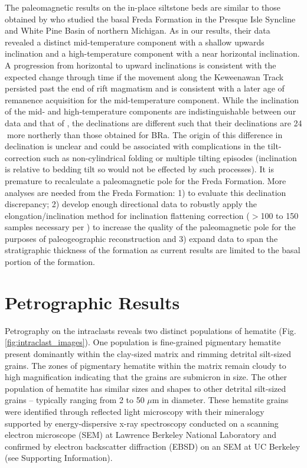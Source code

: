 \documentclass[draft]{agujournal2018}
\begin{document}
The paleomagnetic results on the in-place siltstone beds are similar to those obtained by \citet{Henry1977a} who studied the basal Freda Formation in the Presque Isle Syncline and White Pine Basin of northern Michigan. As in our results, their data revealed a distinct mid-temperature component with a shallow upwards inclination and a high-temperature component with a near horizontal inclination. A progression from horizontal to upward inclinations is consistent with the expected change through time if the movement along the Keweenawan Track persisted past the end of rift magmatism \citep{Fairchild2017a, Swanson-Hysell2018a} and is consistent with a later age of remanence acquisition for the mid-temperature component. While the inclination of the mid- and high-temperature components are indistinguishable between our data and that of \citet{Henry1977a}, the declinations are different such that their declinations are 24\textdegree$\;$more northerly than those obtained for BRa. The origin of this difference in declination is unclear and could be associated with complications in the tilt-correction such as non-cylindrical folding or multiple tilting episodes (inclination is relative to bedding tilt so would not be effected by such processes). It is premature to recalculate a paleomagnetic pole for the Freda Formation. More analyses are needed from the Freda Formation: 1) to evaluate this declination discrepancy; 2) develop enough directional data to robustly apply the elongation/inclination method for inclination flattening correction ($>$100 to 150 samples necessary per \citealp{Tauxe2008a}) to increase the quality of the paleomagnetic pole for the purposes of paleogeographic reconstruction and 3) expand data to span the stratigraphic thickness of the formation as current results are limited to the basal portion of the formation.

\section*{Petrographic Results}

Petrography on the intraclasts reveals two distinct populations of hematite (Fig. \ref{fig:intraclast_images}). One population is fine-grained pigmentary hematite present dominantly within the clay-sized matrix and rimming detrital silt-sized grains. The zones of pigmentary hematite within the matrix remain cloudy to high magnification indicating that the grains are submicron in size. The other population of hematite has similar sizes and shapes to other detrital silt-sized grains -- typically ranging from 2 to 50 $\mu$m in diameter. These hematite grains were identified through reflected light microscopy with their mineralogy supported by energy-dispersive x-ray spectroscopy conducted on a scanning electron microscope (SEM) at Lawrence Berkeley National Laboratory and confirmed by electron backscatter diffraction (EBSD) on an SEM at UC Berkeley (see Supporting Information). 
\end{document}
